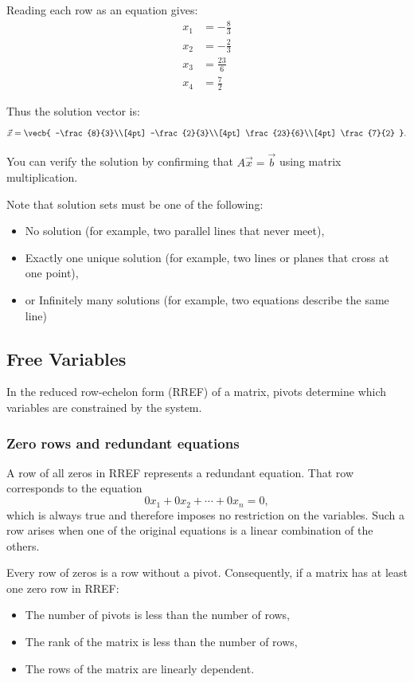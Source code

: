 Reading each row as an equation gives:
\begin{align*}
x_1 &= -\frac{8}{3}\\
x_2 &= -\frac{2}{3}\\
x_3 &= \frac{23}{6}\\
x_4 &= \frac{7}{2}
\end{align*}

Thus the solution vector is:
\[
\vec{x}=\vecb{
-\frac{8}{3}\\[4pt]
-\frac{2}{3}\\[4pt]
\frac{23}{6}\\[4pt]
\frac{7}{2}
}.
\]

You can verify the solution by confirming that $A\vec{x}=\vec{b}$ using matrix multiplication.

Note that solution sets must be one of the following:
\begin{itemize}
       \item No solution (for example, two parallel lines that never meet),
       \item Exactly one unique solution (for example, two lines or planes that cross at one point),
       \item or Infinitely many solutions (for example, two equations describe the same line)
\end{itemize}
\subsection{Free Variables}

In the reduced row-echelon form (RREF) of a matrix, pivots determine which variables are constrained by the system.

\subsubsection{Zero rows and redundant equations}
A row of all zeros in RREF represents a redundant equation. That row corresponds to the equation
\[
0x_1 + 0x_2 + \cdots + 0x_n = 0,
\]
which is always true and therefore imposes no restriction on the variables.  
Such a row arises when one of the original equations is a linear combination of the others.

Every row of zeros is a row without a pivot. Consequently, if a matrix has at least one zero row in RREF:
\begin{itemize}
    \item The number of pivots is less than the number of rows,
    \item The rank of the matrix is less than the number of rows,
    \item The rows of the matrix are linearly dependent.
\end{itemize}

